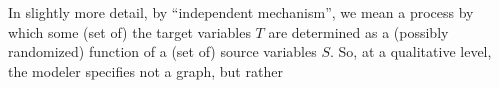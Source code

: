 %
In slightly more detail, by ``independent mechanism'', we mean a process by which
%
some (set of) the target variables $T$ are determined as a
(possibly randomized) function of a (set of) source variables $S$.
So, at a
qualitative
level, the modeler 
specifies not a graph, but rather
